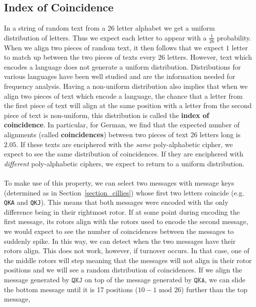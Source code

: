 \subsection{Index of Coincidence}\label{ioc}
In a string of random text from a 26 letter alphabet we get a uniform
distribution of letters. Thus we expect each letter to appear with a
$\frac{1}{26}$ probability. When we align two pieces of random text,
it then follows that we expect $1$ letter to match up between the two pieces of texts
every $26$ letters. However, text which encodes a language does
not generate a uniform distribution. Distributions for various
languages have been well studied and are the information needed for
frequency analysis. Having a non-uniform distribution also implies
that when we align two pieces of text which encode a language, the
chance that a letter from the first piece of text will align at the
same position with a letter
from the second piece of text is non-uniform, this distribution is
called the {\bf{index of coincidence}}. In particular, for German, we
find that the expected number of alignments (called
{\bf{coincidences}}) between two pieces of text $26$ letters long is
$2.05$. If these texts
are enciphered with the \emph{same} poly-alphabetic cipher, we expect
to see the same distribution of coincidences. If they are enciphered
with \emph{different} poly-alphabetic ciphers, we expect to return to
a uniform distribution.
\\\\To make use of this property, we can select two messages with
message keys (determined as in Section~\ref{section_cillies}) whose first two
letters coincide (e.g. \texttt{QKA} and
\texttt{QKJ}). This means that both messages were encoded with the
only difference being in their rightmost rotor. If at some point
during encoding the first message, its rotors align with the rotors
used to encode the second message, we would expect to see the number
of coincidences between the messages to suddenly spike.
In this way, we can detect when the two messages have their rotors
align. This does not work, however, if turnover occurs. In that case, one of the middle rotors will step meaning that the 
messages will not align in their rotor positions and we will see a
random distribution of coincidences. If we align the message
generated by $\texttt{QKJ}$ on top of the message generated by
$\texttt{QKA}$, we can slide the bottom message until it is 17 positions ($10-1 \text{ mod } 26$)
further than the top message,

